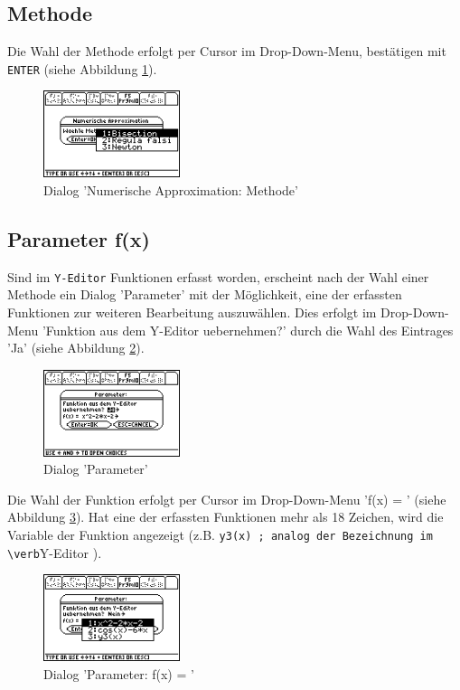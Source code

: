 \documentclass[
	a4paper							%
	,12pt							%
	,twoside						%
	,openright						%
]{scrreprt}							%
\begin{document}
\subsection*{Methode}
Die Wahl der Methode erfolgt per Cursor im Drop-Down-Menu, best\"atigen mit \verb|ENTER| (siehe Abbildung \ref{fig:MethodeApproximation}).
\begin{figure}[h]
  \centering
  \includegraphics[width=4cm]{img/nummeth_image010.png}
  \caption{Dialog 'Numerische Approximation: Methode’}
  \label{fig:MethodeApproximation}
\end{figure}

\subsection*{Parameter f(x)}
Sind im \verb|Y-Editor| Funktionen erfasst worden, erscheint nach der Wahl einer Methode ein Dialog 'Parameter’ mit der M\"oglichkeit, eine der erfassten Funktionen zur weiteren Bearbeitung auszuw\"ahlen. Dies erfolgt im Drop-Down-Menu 'Funktion aus dem Y-Editor uebernehmen?’ durch die Wahl des Eintrages 'Ja’ (siehe Abbildung \ref{fig:ParameterFxFrage}).
\begin{figure}[h]
  \centering
  \includegraphics[width=4cm]{img/nummeth_image014.png}
  \caption{Dialog 'Parameter'}
  \label{fig:ParameterFxFrage}
\end{figure}

Die Wahl der Funktion erfolgt per Cursor im Drop-Down-Menu 'f(x) = ’ (siehe Abbildung \ref{fig:ParameterFxWahl}). Hat eine der erfassten Funktionen mehr als 18 Zeichen, wird die Variable der Funktion angezeigt (z.B. \verb|y3(x) ; analog der Bezeichnung im \verb|Y-Editor ).
\begin{figure}[h]
  \centering
  \includegraphics[width=4cm]{img/nummeth_image016.png}
  \caption{Dialog 'Parameter: f(x) = '}
  \label{fig:ParameterFxWahl}
\end{figure}
\end{document}
